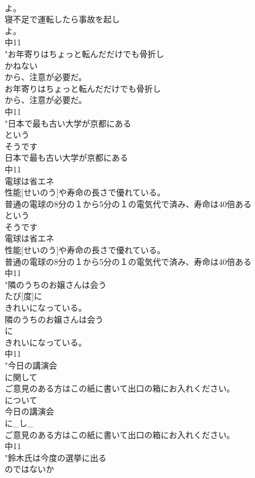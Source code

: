 \documentclass[8pt]{extreport}
\begin{document}
\begin{CJK}{UTF8}{min}
\\	よ。
\\	寝不足で運転したら事故を起し
\\	よ。
\\	中11
\\	"お年寄りはちょっと転んだだけでも骨折し
\\	かねない
\\	から、注意が必要だ。
\\	お年寄りはちょっと転んだだけでも骨折し
\\	から、注意が必要だ。
\\	中11
\\	"日本で最も古い大学が京都にある
\\	という
\\	そうです	
\\	日本で最も古い大学が京都にある
\\	中11
\\	電球は省エネ
\\	性能[せいのう]や寿命の長さで優れている。
\\	普通の電球の8分の１から5分の１の電気代で済み、寿命は40倍ある
\\	という
\\	そうです	
\\	電球は省エネ
\\	性能[せいのう]や寿命の長さで優れている。
\\	普通の電球の8分の１から5分の１の電気代で済み、寿命は40倍ある
\\	中11
\\	"隣のうちのお嬢さんは会う
\\	たび[度]に
\\	きれいになっている。
\\	隣のうちのお嬢さんは会う
\\	に
\\	きれいになっている。
\\	中11
\\	"今日の講演会
\\	に関して
\\	ご意見のある方はこの紙に書いて出口の箱にお入れください。
\\	について	
\\	今日の講演会
\\	に_し_
\\	ご意見のある方はこの紙に書いて出口の箱にお入れください。
\\	中11
\\	"鈴木氏は今度の選挙に出る
\\	のではないか

\end{CJK}
\end{document}
